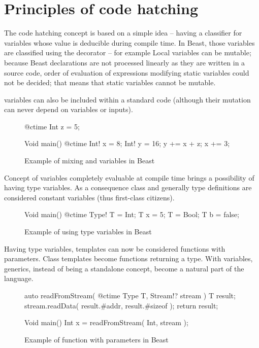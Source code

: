 \documentclass{ExcelAtFIT}
\begin{document}
\section{Principles of code hatching}

The code hatching concept is based on a simple idea -- having a classifier for variables whose value is deducible during compile time. In Beast, those variables are classified using the  decorator -- for example  Local \ctime variables can be mutable; because Beast declarations are not processed linearly as they are written in a source code, order of evaluation of expressions modifying static \ctime variables could not be decided; that means that static \ctime variables cannot be mutable.

\ctime variables can also be included within a standard code (although their mutation can never depend on \nonctime variables or inputs).

\begin{figure}[h]
	\begin{code}
@ctime Int z = 5;
		
Void main() {
	@ctime Int! x = 8;
	Int! y = 16;
	y += x + z;
	x += 3;
}
	\end{code}
	\caption{Example of mixing \ctime and \nonctime variables in Beast}
\end{figure}

Concept of variables completely evaluable at compile time brings a possibility of having \ctime type variables. As a consequence class and generally type definitions are considered \ctime constant variables (thus first-class citizens).

\begin{figure}[h]
	\begin{code}
Void main() {
	@ctime Type! T = Int;
	T x = 5;
	T = Bool;
	T b = false;
}
	\end{code}
	\caption{Example of using type variables in Beast}
\end{figure}

Having type variables, templates can now be considered functions with \ctime parameters. Class templates become functions returning a type. With \ctime variables, generics, instead of being a standalone concept, become a natural part of the language.

\begin{figure}[h]
	\begin{code}
auto readFromStream( @ctime Type T, Stream!? stream )
{
	T result;
	stream.readData( result.#addr, result.#sizeof );
	return result;
}

Void main() {
	Int x = readFromStream( Int, stream );
}
	\end{code}
	\caption{Example of function with \ctime parameters in Beast}
\end{figure}
\end{document}
